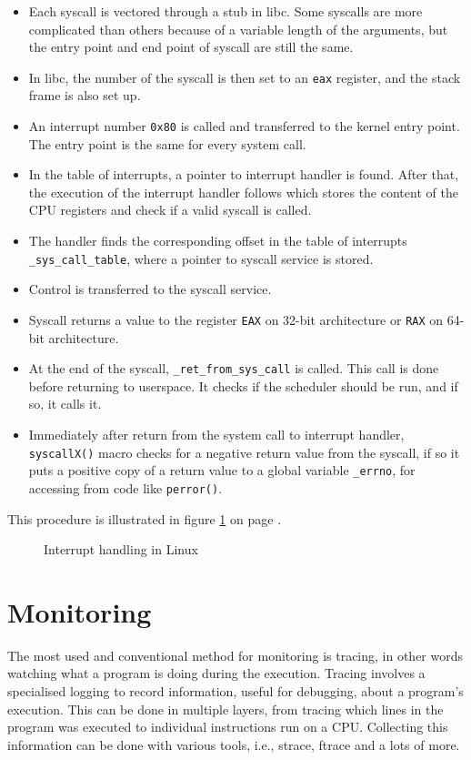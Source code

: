 \begin{itemize}
	\item Each syscall is vectored through a stub in libc.
    	  Some syscalls are more complicated than others because of a variable length of the arguments, but the entry point and end point of syscall are still the same.
	\item In libc, the number of the syscall is then set to an \texttt{eax} register, and the stack frame is also set up.
	\item An interrupt number \texttt{0x80} is called and transferred to the kernel entry point.
    	  The entry point is the same for every system call.
	\item In the table of interrupts, a pointer to interrupt handler is found.
    	  After that, the execution of the interrupt handler follows which stores the content of the CPU registers and check if a valid syscall is called.
	\item The handler finds the corresponding offset in the table of interrupts \texttt{\_sys\_call\_table}, where a pointer to syscall service is stored.
	\item Control is transferred to the syscall service.
	\item Syscall returns a value to the register \texttt{EAX} on 32-bit architecture or \texttt{RAX} on 64-bit architecture.
	\item At the end of the syscall, \texttt{\_ret\_from\_sys\_call\(\)} is called.
    	  This call is done before returning to userspace.
          It checks if the scheduler should be run, and if so, it calls it.
	\item Immediately after return from the system call to interrupt handler, \texttt{syscallX()} macro checks for a negative return value from the syscall, if so it puts a positive copy of a return value to a global variable \texttt{\_errno}, for accessing from code like \texttt{perror()}.
\end{itemize}

This procedure is illustrated in figure \ref{fig:tikz:int_handling} on page \pageref{fig:tikz:int_handling}.

\begin{figure}[]
  \centering
  
  \caption{Interrupt handling in Linux}
  \label{fig:tikz:int_handling}
\end{figure}


\section{Monitoring}
The most used and conventional method for monitoring is tracing, in other words watching what a program is doing during the execution.
Tracing involves a specialised logging to record information, useful for debugging, about a program's execution.
This can be done in multiple layers, from tracing which lines in the program was executed to individual instructions run on a CPU.
Collecting this information can be done with various tools, i.e., strace, ftrace and a lots of more.

